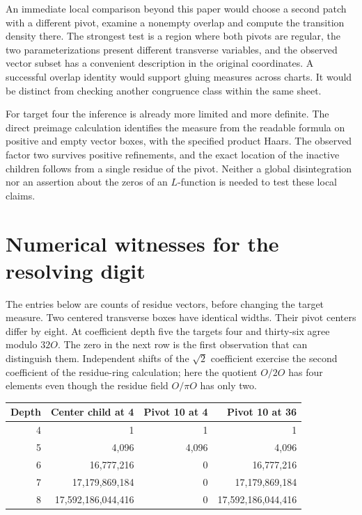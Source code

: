 \documentclass[12pt,letterpaper]{article}
\begin{document}
An immediate local comparison beyond this paper would choose a second patch with a different pivot, examine a nonempty overlap and compute the transition density there. The strongest test is a region where both pivots are regular, the two parameterizations present different transverse variables, and the observed vector subset has a convenient description in the original coordinates. A successful overlap identity would support gluing measures across charts. It would be distinct from checking another congruence class within the same sheet.

For target four the inference is already more limited and more definite. The direct preimage calculation identifies the measure from the readable formula on positive and empty vector boxes, with the specified product Haars. The observed factor two survives positive refinements, and the exact location of the inactive children follows from a single residue of the pivot. Neither a global disintegration nor an assertion about the zeros of an $L$-function is needed to test these local claims.

\section{Numerical witnesses for the resolving digit}
The entries below are counts of residue vectors, before changing the target measure. Two centered transverse boxes have identical widths. Their pivot centers differ by eight. At coefficient depth five the targets four and thirty-six agree modulo $32O$. The zero in the next row is the first observation that can distinguish them. Independent shifts of the $\sqrt2$ coefficient exercise the second coefficient of the residue-ring calculation; here the quotient $O/2O$ has four elements even though the residue field $O/\pi O$ has only two.

\begin{center}\small\begin{tabular}{@{}rrrr@{}}\toprule
Depth & Center child at 4 & Pivot 10 at 4 & Pivot 10 at 36\\\midrule
4 & 1 & 1 & 1\\
5 & 4,096 & 4,096 & 4,096\\
6 & 16,777,216 & 0 & 16,777,216\\
7 & 17,179,869,184 & 0 & 17,179,869,184\\
8 & 17,592,186,044,416 & 0 & 17,592,186,044,416\\
\bottomrule\end{tabular}\end{center}
\end{document}

